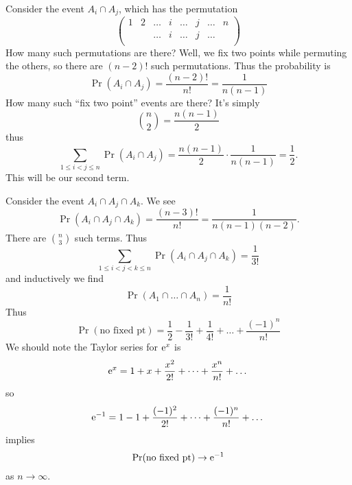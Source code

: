 \M Consider the event $A_i\cap A_j$, which has the permutation
\begin{equation}
\begin{pmatrix}
1 & 2 & \dots & i & \dots & j & \dots & n\\
  &   & \dots & i & \dots & j & \dots &  \\
\end{pmatrix}
\end{equation}
How many such permutations are there? Well, we fix two points while
permuting the others, so there are $(n-2)!$ such permutations. Thus the
probability is
\begin{equation}
\Pr(A_{i}\cap A_{j}) = \frac{(n-2)!}{n!}=\frac{1}{n(n-1)}
\end{equation}
How many such ``fix two point'' events are there? It's simply
\begin{equation}
\binom{n}{2}=\frac{n(n-1)}{2}
\end{equation}
thus
\begin{equation}
\sum_{1\leq i<j\leq n} \Pr(A_{i}\cap A_{j})
= \frac{n(n-1)}{2}\cdot\frac{1}{n(n-1)}=\frac{1}{2}.
\end{equation}
This will be our second term.

\M Consider the event $A_i\cap A_j\cap A_k$. We see
\begin{equation}
\Pr(A_i\cap A_j\cap A_k) = \frac{(n-3)!}{n!}=\frac{1}{n(n-1)(n-2)}.
\end{equation}
There are $\binom{n}{3}$ such terms. Thus
\begin{equation}
\sum_{1\leq i<j<k\leq n}\Pr(A_i\cap A_j\cap A_k)=\frac{1}{3!}
\end{equation}
and inductively we find
\begin{equation}
\Pr(A_1\cap\dots\cap A_n)=\frac{1}{n!}
\end{equation}
Thus
\begin{equation}
\Pr(\mbox{no fixed pt}) = \frac{1}{2}
- \frac{1}{3!}+\frac{1}{4!}+\dots+\frac{(-1)^{n}}{n!}
\end{equation}
We should note the Taylor series for $\mathrm{e}^{x}$ is
\begin{equation}
\mathrm{e}^{x}=1+x+\frac{x^{2}}{2!}+\dots+\frac{x^{n}}{n!}+\dots
\end{equation}
so
\begin{equation}
\mathrm{e}^{-1}=1-1+\frac{(-1)^{2}}{2!}+\dots+\frac{(-1)^{n}}{n!}+\dots
\end{equation}
implies
\begin{equation}
\mathop{\mathrm{Pr}}\nolimits(\mbox{no fixed pt})\to\mathrm{e}^{-1}
\end{equation}
as $n\to\infty$.

